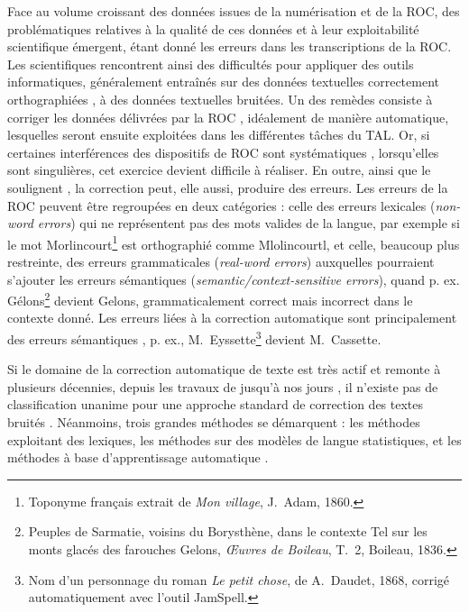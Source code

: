 Face au volume croissant des données issues de la numérisation et de la ROC, des problématiques relatives à la qualité de ces données et à leur exploitabilité scientifique émergent, étant donné 
les erreurs dans les transcriptions de la ROC. Les scientifiques rencontrent ainsi des difficultés pour appliquer des outils informatiques, généralement entraînés sur des données textuelles correctement orthographiées \cite{DBLP:journals/corr/EshelCRMYL17}, à des données textuelles bruitées. Un des remèdes consiste à corriger les données délivrées par la ROC \cite{DBLP:conf/taln/SagotG14}, idéalement de manière automatique, lesquelles seront ensuite exploitées dans les différentes tâches du TAL. Or, si certaines interférences des dispositifs de ROC sont systématiques \cite{stanislawek-2019}, lorsqu’elles sont singulières, cet exercice devient difficile à réaliser. En outre, ainsi que le soulignent , la correction peut, elle aussi, produire des erreurs. 
Les erreurs de la ROC peuvent être regroupées en deux catégories \cite{oger} : celle des erreurs lexicales (\textit{non-word errors}) qui ne représentent pas des mots valides de la langue, par exemple si le mot \og{}Morlincourt\fg{}\footnote{Toponyme français extrait de \textit{Mon village}, J.\ Adam, 1860.} est orthographié comme \og{}Mlolincourtl\fg{}, et celle, beaucoup plus restreinte, des erreurs grammaticales (\textit{real-word errors}) \cite{wisniewski} auxquelles pourraient s'ajouter les erreurs sémantiques (\textit{semantic/context-sensitive errors}), quand p. ex. \og{}Gélons\fg{}\footnote{Peuples de Sarmatie, voisins du Borysthène, dans le contexte  \og{}Tel sur les monts glacés des farouches Gelons\fg{}, \textit{Œuvres de Boileau}, T.\ 2, Boileau, 1836.} devient \og{}Gelons\fg{}, grammaticalement correct mais incorrect dans le contexte donné. Les erreurs liées à la correction automatique sont principalement des erreurs sémantiques \cite{azmi}, p. ex., \og{}M.\ Eyssette\fg{}\footnote{Nom d’un personnage du roman \textit{Le petit chose}, de A.\ Daudet, 1868, corrigé automatiquement avec l'outil JamSpell.} devient \og{}M.\ Cassette\fg{}. 

Si le domaine de la correction automatique de texte est très actif et remonte à plusieurs décennies, depuis les travaux de  jusqu’à nos jours \cite{nguyen2021}, il n’existe pas de classification unanime pour une approche standard de correction des textes bruités \cite{DBLP:journals/corr/abs-1203-5255,dumasmilneedwards:tel-01562039,Nguyen-2020}. %
Néanmoins, trois grandes méthodes se démarquent : les méthodes exploitant des lexiques, les méthodes sur des modèles de langue statistiques, et les méthodes à base d’apprentissage automatique \cite{petkovic2022impact}. 

